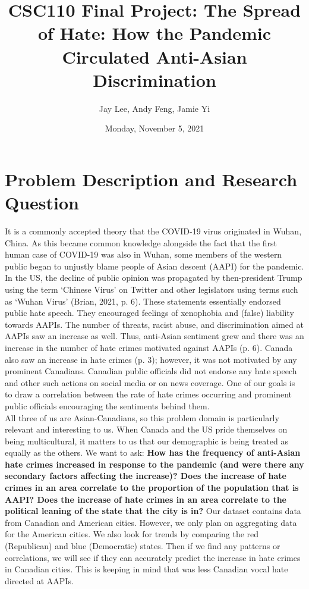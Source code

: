 \documentclass[fontsize=11pt]{article}
\title{CSC110 Final Project: The Spread of Hate: How the Pandemic Circulated Anti-Asian Discrimination}
\author{Jay Lee, Andy Feng, Jamie Yi}
\date{Monday, November 5, 2021}
\begin{document}
\maketitle

\section*{Problem Description and Research Question}

\quad It is a commonly accepted theory that the COVID-19 virus originated in Wuhan, China. As this became common knowledge alongside the fact that the first human case of COVID-19 was also in Wuhan, some members of the western public began to unjustly blame people of Asian descent (AAPI) for the pandemic. In the US, the decline of public opinion was propagated by then-president Trump using the term ‘Chinese Virus’ on Twitter and other legislators using terms such as ‘Wuhan Virus’ (Brian, 2021, p. 6). These statements essentially endorsed public hate speech. They encouraged feelings of xenophobia and (false) liability towards AAPIs. The number of threats, racist abuse, and discrimination aimed at AAPIs saw an increase as well. Thus, anti-Asian sentiment grew and there was an increase in the number of hate crimes motivated against AAPIs (p. 6). Canada also saw an increase in hate crimes (p. 3); however, it was not motivated by any prominent Canadians. Canadian public officials did not endorse any hate speech and other such actions on social media or on news coverage. One of our goals is to draw a correlation between the rate of hate crimes occurring and prominent public officials encouraging the sentiments behind them.\\

All three of us are Asian-Canadians, so this problem domain is particularly relevant and interesting to us. When Canada and the US pride themselves on being multicultural, it matters to us that our demographic is being treated as equally as the others. We want to ask: \textbf{How has the frequency of anti-Asian hate crimes increased in response to the pandemic (and were there any secondary factors affecting the increase)? Does the increase of hate crimes in an area correlate to the proportion of the population that is AAPI? Does the increase of hate crimes in an area correlate to the political leaning of the state that the city is in?} Our dataset contains data from Canadian and American cities. However, we only plan on aggregating data for the American cities. We also look for trends by comparing the red (Republican) and blue (Democratic) states. Then if we find any patterns or correlations, we will see if they can accurately predict the increase in hate crimes in Canadian cities. This is keeping in mind that was less Canadian vocal hate directed at AAPIs.
\end{document}
